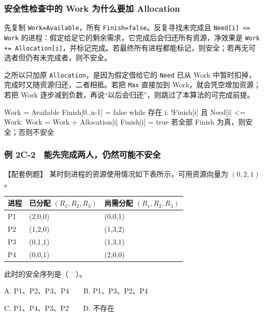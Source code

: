\subsubsection{安全性检查中的 Work 为什么要加 Allocation}\label{OS02-auto-26}

先复制 \texttt{Work=\allowbreak{}Available}，所有 \texttt{Finish=\allowbreak{}false}。反复寻找未完成且 \texttt{Need[i] <\allowbreak{}=\allowbreak{} Work} 的进程：假定给足它的剩余需求，它完成后会归还所有资源，净效果是 \texttt{Work +\allowbreak{}=\allowbreak{} Allocation[i]}，并标记完成。若最终所有进程都能标记，则安全；若再无可选者但仍有未完成者，则不安全。

之所以只加原 \texttt{Allocation}，是因为假定借给它的 \texttt{Need} 已从 Work 中暂时扣掉，完成时又随资源归还，二者相抵。若把 \texttt{Max} 直接加到 Work，就会凭空增加资源；若把 Work 逐步减到负数，再说``以后会归还''，则跳过了本算法的可完成前提。

\begin{codeblock}[language={}]
Work = Available
Finish[0..n-1] = false
while 存在 i: !Finish[i] 且 Need[i] <= Work:
    Work = Work + Allocation[i]
    Finish[i] = true
若全部 Finish 为真，则安全；否则不安全
\end{codeblock}

\subsubsection{例 2C-2　能先完成两人，仍然可能不安全}\label{OS02-ex4-2}

\begin{example}[配套例题]

【配套例题】 某时刻进程的资源使用情况如下表所示，可用资源向量为 \((0,2,1)\)。

\begin{wideblock}

\par\medskip\noindent\begin{minipage}{\linewidth}\fontsize{9.3}{12}\selectfont\begin{tabularx}{\linewidth}{@{}YYY@{}}
\toprule\noalign{}
进程 & 已分配 \((R_1,R_2,R_3)\) & 尚需分配 \((R_1,R_2,R_3)\) \\
\midrule\noalign{}


P1 & (2,0,0) & (0,0,1) \\
P2 & (1,2,0) & (1,3,2) \\
P3 & (0,1,1) & (1,3,1) \\
P4 & (0,0,1) & (2,0,0) \\
\bottomrule\end{tabularx}
\end{minipage}\par\medskip

\end{wideblock}

此时的安全序列是（　）。

A. P1、P2、P3、P4　　B. P1、P3、P2、P4

C. P1、P4、P3、P2　　D. 不存在

\end{example}

